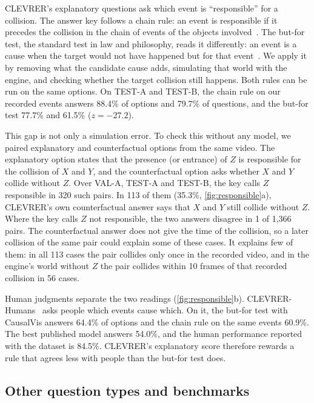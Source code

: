 \IfFileExists{TMLR}{\documentclass[10pt]{article}}%
\newcommand{\sys}{CausalVis}
\begin{document}
CLEVRER's explanatory questions ask which event is ``responsible'' for a collision.
The answer key follows a chain rule: an event is responsible if it precedes the collision in the chain of events of the objects involved~\cite{yi2020clevrer}.
The but-for test, the standard test in law and philosophy, reads it differently: an event is a cause when the target would not have happened but for that event~\cite{lewis1973causation,gerstenberg2021csm}.
We apply it by removing what the candidate cause adds, simulating that world with the engine, and checking whether the target collision still happens.
Both rules can be run on the same options.
On TEST-A and TEST-B, the chain rule on our recorded events answers 88.4\% of options and 79.7\% of questions, and the but-for test 77.7\% and 61.5\% ($z=-27.2$).

This gap is not only a simulation error.
To check this without any model, we paired explanatory and counterfactual options from the same video.
The explanatory option states that the presence (or entrance) of $Z$ is responsible for the collision of $X$ and $Y$, and the counterfactual option asks whether $X$ and $Y$ collide without $Z$.
Over VAL-A, TEST-A and TEST-B, the key calls $Z$ responsible in 320 such pairs.
In 113 of them (35.3\%, \cref{fig:responsible}a), CLEVRER's own counterfactual answer says that $X$ and $Y$ still collide without $Z$.
Where the key calls $Z$ not responsible, the two answers disagree in 1 of 1,366 pairs.
The counterfactual answer does not give the time of the collision, so a later collision of the same pair could explain some of these cases.
It explains few of them: in all 113 cases the pair collides only once in the recorded video, and in the engine's world without $Z$ the pair collides within 10 frames of that recorded collision in 56 cases.

Human judgments separate the two readings (\cref{fig:responsible}b).
CLEVRER-Humans~\cite{mao2022clevrerhumans} asks people which events cause which.
On it, the but-for test with \sys{} answers 64.4\% of options and the chain rule on the same events 60.9\%.
The best published model answers 54.0\%, and the human performance reported with the dataset is 84.5\%.
CLEVRER's explanatory score therefore rewards a rule that agrees less with people than the but-for test does.

\subsection{Other question types and benchmarks}
\label{sec:other}
\end{document}
